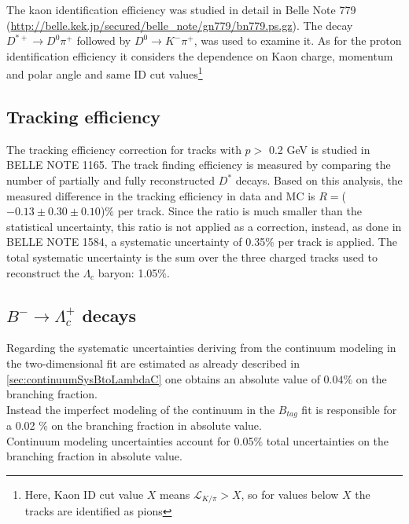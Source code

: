  \vspace{0.2 cm}
 \noindent  The kaon identification efficiency was studied in detail in Belle Note 779 \cite{KIDeff} (\url{http://belle.kek.jp/secured/belle_note/gn779/bn779.ps.gz}). The decay $D^{*+} \rightarrow D^0 \pi^+$ followed by $D^0 \rightarrow K^- \pi^+$, was used to examine it. As for the proton identification efficiency it considers the dependence on Kaon charge, momentum and polar angle and same ID cut values\footnote{Here, Kaon ID cut value $X$ means $  \mathcal{L}_{K/\pi} > X$, so for values below $X$ the tracks are identified as pions} 

 \subsection{Tracking efficiency}
 The tracking efficiency correction for tracks with $p > $ 0.2 GeV is studied in BELLE NOTE 1165.%
The track finding efficiency is measured by comparing the number of partially and fully reconstructed
 $D^*$ decays. Based on this analysis, the measured difference in the tracking efficiency in data and MC is $R = $($- 0.13 \pm 0.30  \pm 0.10$)$\%$ per track.  Since the ratio is much smaller
 than the statistical uncertainty, this ratio is not applied as a correction, instead, as done in BELLE NOTE 1584, a systematic uncertainty of 0.35$\%$ per track is applied. The total systematic uncertainty is the sum over the 
 three charged tracks used to reconstruct the $\Lambda_c$ baryon: 1.05$\%$.


\subsection{$B^- \rightarrow \Lambda_c^+$ decays}
Regarding the systematic uncertainties deriving from the continuum modeling in the two-dimensional fit are estimated as 
already described in \ref{sec:continuumSysBtoLambdaC} one obtains an absolute value of $0.04\%$ on the branching fraction.\\
Instead the imperfect modeling of the continuum in the $B_{tag}  $ fit is responsible for a 0.02 $\%$ on the branching fraction in absolute value.\\
Continuum modeling uncertainties account for 0.05$\%$ total uncertainties on the branching fraction in absolute value.
\vspace{1 cm}

